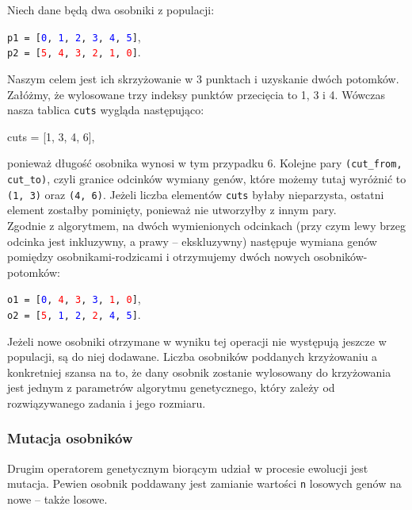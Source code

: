 \documentclass[12pt,a4paper]{article}
\theoremstyle{definition}
\begin{document}
\begin{tcolorbox}[title=Przykład --- operacja krzyżowania]
Niech dane będą dwa osobniki z populacji:
\begin{center}
	\texttt{p1 = [\textcolor{blue}{0}, \textcolor{blue}{1}, \textcolor{blue}{2}, \textcolor{blue}{3}, \textcolor{blue}{4}, \textcolor{blue}{5}]},\\
	\texttt{p2 = [\textcolor{red}{5}, \textcolor{red}{4}, \textcolor{red}{3}, \textcolor{red}{2}, \textcolor{red}{1}, \textcolor{red}{0}]}.
\end{center}
Naszym celem jest ich skrzyżowanie w 3 punktach i uzyskanie dwóch potomków. Załóżmy, że wylosowane trzy indeksy punktów przecięcia to 1, 3 i 4. Wówczas nasza tablica \texttt{cuts} wygląda następująco:
\begin{center}
	cuts = [1, 3, 4, 6],
\end{center}
ponieważ długość osobnika wynosi w tym przypadku 6. Kolejne pary \texttt{(cut\_from, cut\_to)}, czyli granice odcinków wymiany genów, które możemy tutaj wyróżnić to \texttt{(1, 3)} oraz \texttt{(4, 6)}. Jeżeli liczba elementów \texttt{cuts} byłaby nieparzysta, ostatni element zostałby pominięty, ponieważ nie utworzyłby z innym pary.\\

\noindent
Zgodnie z algorytmem, na dwóch wymienionych odcinkach (przy czym lewy brzeg odcinka jest inkluzywny, a prawy -- ekskluzywny) następuje wymiana genów pomiędzy osobnikami-rodzicami i otrzymujemy dwóch nowych osobników-potomków:
\begin{center}
	\texttt{o1 = [\textcolor{blue}{0}, \textcolor{red}{4}, \textcolor{red}{3}, \textcolor{blue}{3}, \textcolor{red}{1}, \textcolor{red}{0}]},\\
	\texttt{o2 = [\textcolor{red}{5}, \textcolor{blue}{1}, \textcolor{blue}{2}, \textcolor{red}{2}, \textcolor{blue}{4}, \textcolor{blue}{5}]}.
\end{center}
\end{tcolorbox}

\vspace{0.5em}
\noindent
Jeżeli nowe osobniki otrzymane w wyniku tej operacji nie występują jeszcze w populacji, są do niej dodawane. Liczba osobników poddanych krzyżowaniu a konkretniej szansa na to, że dany osobnik zostanie wylosowany do krzyżowania jest jednym z parametrów algorytmu genetycznego, który zależy od rozwiązywanego zadania i jego rozmiaru.

\subsubsection{Mutacja osobników}
Drugim operatorem genetycznym biorącym udział w procesie ewolucji jest mutacja. Pewien osobnik poddawany jest zamianie wartości \texttt{n} losowych genów na nowe -- także losowe.\\
\end{document}
